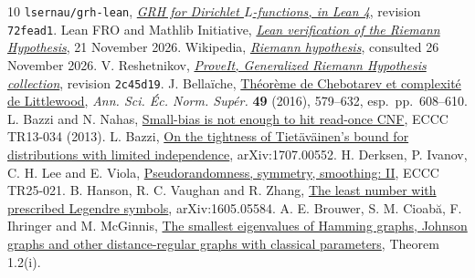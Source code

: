 \documentclass[11pt,letterpaper]{article}
\theoremstyle{research}
\begin{document}
\begingroup\small
\begin{thebibliography}{10}\setlength{\itemsep}{0pt}\setlength{\parskip}{0pt}
 \texttt{lsernau/grh-lean}, \href{https://github.com/lsernau/grh-lean/tree/72fead102f663d5c7a407964a13dc0cf9d977207}{\emph{GRH for Dirichlet $L$-functions, in Lean 4}}, revision \texttt{72fead1}.
 Lean FRO and Mathlib Initiative, \href{https://leanprover-community.github.io/blog/posts/riemann-hypothesis/}{\emph{Lean verification of the Riemann Hypothesis}}, 21 November 2026.
 Wikipedia, \href{https://en.wikipedia.org/wiki/Riemann_hypothesis}{\emph{Riemann hypothesis}}, consulted 26 November 2026.
 V. Reshetnikov, \href{https://github.com/VladimirReshetnikov/ProveIt/tree/2c45d198070f93209d6f0faa2d387ef0a2c4e72c/Analysis/GeneralizedRiemannHypothesis}{\emph{ProveIt, Generalized Riemann Hypothesis collection}}, revision \texttt{2c45d19}.
 J. Bellaïche, \href{https://doi.org/10.24033/asens.2291}{Théorème de Chebotarev et complexité de Littlewood}, \emph{Ann. Sci. Éc. Norm. Supér.} \textbf{49} (2016), 579--632, esp.\ pp.\ 608--610.
 L. Bazzi and N. Nahas, \href{https://eccc.weizmann.ac.il/report/2013/034/}{Small-bias is not enough to hit read-once CNF}, ECCC TR13-034 (2013).
 L. Bazzi, \href{https://arxiv.org/abs/1707.00552}{On the tightness of Tietäväinen's bound for distributions with limited independence}, arXiv:1707.00552.
 H. Derksen, P. Ivanov, C. H. Lee and E. Viola, \href{https://eccc.weizmann.ac.il/report/2025/021/}{Pseudorandomness, symmetry, smoothing: II}, ECCC TR25-021.
 B. Hanson, R. C. Vaughan and R. Zhang, \href{https://arxiv.org/abs/1605.05584}{The least number with prescribed Legendre symbols}, arXiv:1605.05584.
 A. E. Brouwer, S. M. Cioabă, F. Ihringer and M. McGinnis, \href{https://arxiv.org/abs/1709.09011}{The smallest eigenvalues of Hamming graphs, Johnson graphs and other distance-regular graphs with classical parameters}, Theorem 1.2(i).
\end{thebibliography}
\endgroup
\end{document}
